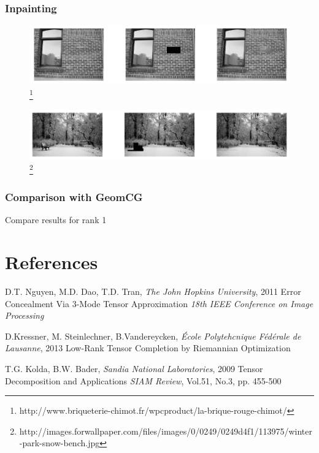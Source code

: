 \documentclass{beamer}
\begin{document}
\begin{frame}
\frametitle{Inpainting}
\begin{figure}
\includegraphics[width=1\linewidth]{InpaintingFacade.png}\footnote{\tiny{http://www.briqueterie-chimot.fr/wpcproduct/la-brique-rouge-chimot/}}
\end{figure}
\begin{figure}
\includegraphics[width=1\linewidth]{InpaintingSnow.png}\footnote{\tiny{http://images.forwallpaper.com/files/images/0/0249/0249d4f1/113975/winter-park-snow-bench.jpg}}
\end{figure}
\end{frame}

\begin{frame}
\frametitle{Comparison with GeomCG}
Compare results for rank 1
\end{frame}

\section*{References}
\begin{frame}


\footnotesize{
\begin{thebibliography}{99} %
\bibitem[ALS]{} D.T. Nguyen, M.D. Dao, T.D. Tran, \textit{The John Hopkins University}, 2011
\newblock Error Concealment Via 3-Mode Tensor Approximation
\newblock \emph{18th IEEE Conference on Image Processing}

\bibitem[GeomCG]{} D.Kressner, M. Steinlechner, B.Vandereycken, \textit{\'Ecole Polytehcnique F\'ed\'erale de Lausanne}, 2013
\newblock Low-Rank Tensor Completion by Riemannian Optimization

 T.G. Kolda, B.W. Bader, \textit{Sandia National Laboratories}, 2009
\newblock Tensor Decomposition and Applications
\newblock \emph{SIAM Review}, Vol.51, No.3, pp. 455-500
\end{thebibliography}
}
\end{frame}
\end{document}

